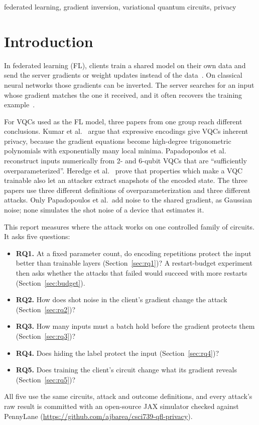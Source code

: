 \documentclass[10pt,conference]{IEEEtran}
\begin{document}
\begin{IEEEkeywords}
federated learning, gradient inversion, variational quantum circuits, privacy
\end{IEEEkeywords}

\section{Introduction}
In federated learning (FL), clients train a shared model on their own data and send the server
gradients or weight updates instead of the data~\cite{mcmahan2017}. On classical neural networks
those gradients can be inverted. The server searches for an input whose gradient matches the one it
received, and it often recovers the training example~\cite{zhu2019,geiping2020}.

For VQCs used as the FL model, three papers from one group reach different conclusions. Kumar et
al.~\cite{kumar2023} argue that expressive encodings give VQCs inherent privacy, because the
gradient equations become high-degree trigonometric polynomials with exponentially many local
minima. Papadopoulos et al.~\cite{papadopoulos2025} reconstruct inputs numerically from 2- and
6-qubit VQCs that are ``sufficiently overparameterized''. Heredge et al.~\cite{heredge2025} prove
that properties which make a VQC trainable also let an attacker extract snapshots of the encoded
state. The three papers use three different definitions of overparameterization and three
different attacks. Only Papadopoulos et al.\ add noise to the shared gradient, as Gaussian noise;
none simulates the shot noise of a device that estimates it.

This report measures where the attack works on one controlled family of circuits. It asks five
questions:
\begin{itemize}
  \item \textbf{RQ1.} At a fixed parameter count, do encoding repetitions protect the input better
  than trainable layers (Section~\ref{sec:rq1})? A restart-budget experiment then asks whether
  the attacks that failed would succeed with more restarts (Section~\ref{sec:budget}).
  \item \textbf{RQ2.} How does shot noise in the client's gradient change the attack
  (Section~\ref{sec:rq2})?
  \item \textbf{RQ3.} How many inputs must a batch hold before the gradient protects them
  (Section~\ref{sec:rq3})?
  \item \textbf{RQ4.} Does hiding the label protect the input (Section~\ref{sec:rq4})?
  \item \textbf{RQ5.} Does training the client's circuit change what its gradient reveals
  (Section~\ref{sec:rq5})?
\end{itemize}
All five use the same circuits, attack and outcome definitions, and every attack's raw result is
committed with an open-source JAX simulator checked against PennyLane
(\url{https://github.com/ajbarea/csci739-qfl-privacy}).
\end{document}
